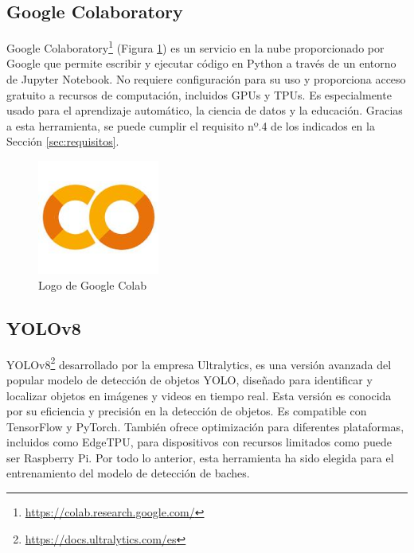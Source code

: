 \subsection{Google Colaboratory}
\label{subsec:googlecolab}

Google Colaboratory\footnote{\url{https://colab.research.google.com/}} (Figura \ref{fig:googlecolab}) es un servicio en la nube proporcionado por Google que permite escribir y ejecutar código en Python a través de un entorno de Jupyter Notebook. No requiere configuración para su uso y proporciona acceso gratuito a recursos de computación, incluidos GPUs y TPUs. Es especialmente usado para el aprendizaje automático, la ciencia de datos y la educación. Gracias a esta herramienta, se puede cumplir el requisito nº.4 de los indicados en la Sección \ref{sec:requisitos}.

\begin{figure} [h!]
	\begin{center}
		\includegraphics[width=4cm]{figs/googlecolab.png}
	\end{center}
	\caption{Logo de Google Colab} 
	\label{fig:googlecolab}
\end{figure}

\subsection{YOLOv8}
\label{subsec:yolov8}

\acs{YOLO}v8\footnote{\url{https://docs.ultralytics.com/es}} desarrollado por la empresa Ultralytics, es una versión avanzada del popular modelo de detección de objetos \ac{YOLO}, diseñado para identificar y localizar objetos en imágenes y videos en tiempo real. Esta versión es conocida por su eficiencia y precisión en la detección de objetos. Es compatible con TensorFlow y PyTorch. También ofrece optimización para diferentes plataformas, incluidos como EdgeTPU, para dispositivos con recursos limitados como puede ser Raspberry Pi. Por todo lo anterior, esta herramienta ha sido elegida para el entrenamiento del modelo de detección de baches. 



